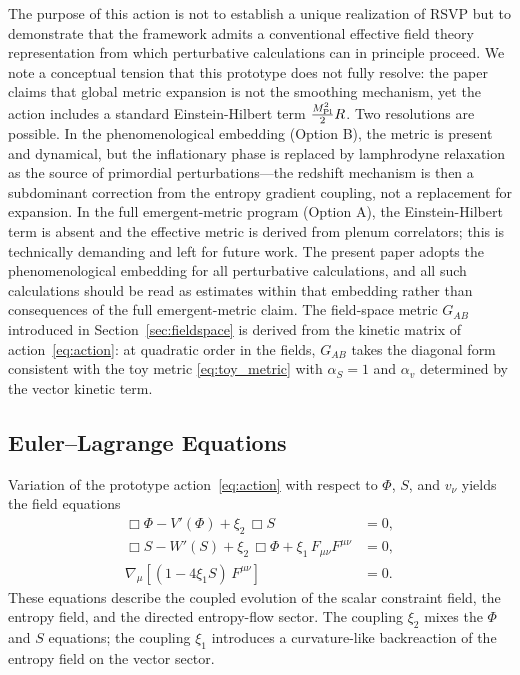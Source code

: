 \documentclass[12pt, a4paper]{article}
\begin{document}
The purpose of this action is not to establish a unique realization of RSVP but to
demonstrate that the framework admits a conventional effective field theory
representation from which perturbative calculations can in principle proceed. We
note a conceptual tension that this prototype does not fully resolve: the paper
claims that global metric expansion is not the smoothing mechanism, yet the action
includes a standard Einstein-Hilbert term $\frac{M_{\rm Pl}^2}{2}R$. Two
resolutions are possible. In the phenomenological embedding (Option B), the metric
is present and dynamical, but the inflationary phase is replaced by lamphrodyne
relaxation as the source of primordial perturbations---the redshift mechanism
is then a subdominant correction from the entropy gradient coupling, not a
replacement for expansion. In the full emergent-metric program (Option A), the
Einstein-Hilbert term is absent and the effective metric is derived from plenum
correlators; this is technically demanding and left for future work. The present
paper adopts the phenomenological embedding for all perturbative calculations,
and all such calculations should be read as estimates within that embedding
rather than consequences of the full emergent-metric claim. The
field-space metric $G_{AB}$ introduced in Section~\ref{sec:fieldspace} is derived
from the kinetic matrix of action~\eqref{eq:action}: at quadratic order in the
fields, $G_{AB}$ takes the diagonal form consistent with the toy metric
\eqref{eq:toy_metric} with $\alpha_S = 1$ and $\alpha_v$ determined by the vector
kinetic term.

\subsection{Euler--Lagrange Equations}
\label{sec:EL}

Variation of the prototype action~\eqref{eq:action} with respect to $\Phi$, $S$,
and $v_\nu$ yields the field equations
\begin{align}
\Box\Phi - V'(\Phi) + \xi_2\,\Box S &= 0, \label{eq:EL_Phi} \\
\Box S - W'(S) + \xi_2\,\Box\Phi + \xi_1\,F_{\mu\nu}F^{\mu\nu} &= 0,
\label{eq:EL_S} \\
\nabla_\mu\!\left[(1 - 4\xi_1 S)\,F^{\mu\nu}\right] &= 0. \label{eq:EL_v}
\end{align}
These equations describe the coupled evolution of the scalar constraint field,
the entropy field, and the directed entropy-flow sector. The coupling $\xi_2$
mixes the $\Phi$ and $S$ equations; the coupling $\xi_1$ introduces a
curvature-like backreaction of the entropy field on the vector sector.
\end{document}
